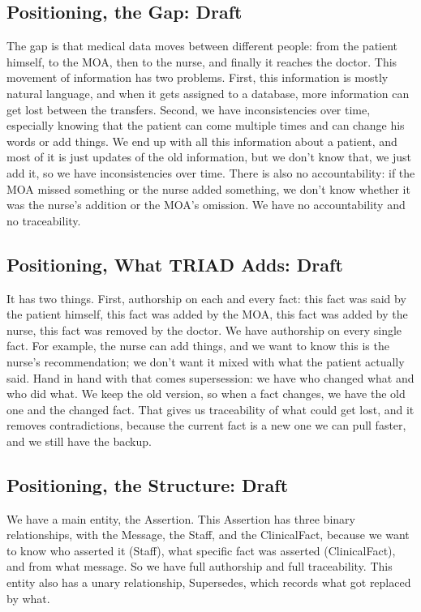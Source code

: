 \documentclass[sigconf]{acmart}
\begin{document}
\subsection{Positioning, the Gap: Draft}
The gap is that medical data moves between different people: from the patient himself, to the MOA, then to the nurse, and finally it reaches the doctor. This movement of information has two problems. First, this information is mostly natural language, and when it gets assigned to a database, more information can get lost between the transfers. Second, we have inconsistencies over time, especially knowing that the patient can come multiple times and can change his words or add things. We end up with all this information about a patient, and most of it is just updates of the old information, but we don't know that, we just add it, so we have inconsistencies over time. There is also no accountability: if the MOA missed something or the nurse added something, we don't know whether it was the nurse's addition or the MOA's omission. We have no accountability and no traceability.

\subsection{Positioning, What TRIAD Adds: Draft}
It has two things. First, authorship on each and every fact: this fact was said by the patient himself, this fact was added by the MOA, this fact was added by the nurse, this fact was removed by the doctor. We have authorship on every single fact. For example, the nurse can add things, and we want to know this is the nurse's recommendation; we don't want it mixed with what the patient actually said. Hand in hand with that comes supersession: we have who changed what and who did what. We keep the old version, so when a fact changes, we have the old one and the changed fact. That gives us traceability of what could get lost, and it removes contradictions, because the current fact is a new one we can pull faster, and we still have the backup.

\subsection{Positioning, the Structure: Draft}
We have a main entity, the Assertion. This Assertion has three binary relationships, with the Message, the Staff, and the ClinicalFact, because we want to know who asserted it (Staff), what specific fact was asserted (ClinicalFact), and from what message. So we have full authorship and full traceability. This entity also has a unary relationship, Supersedes, which records what got replaced by what.
\end{document}
